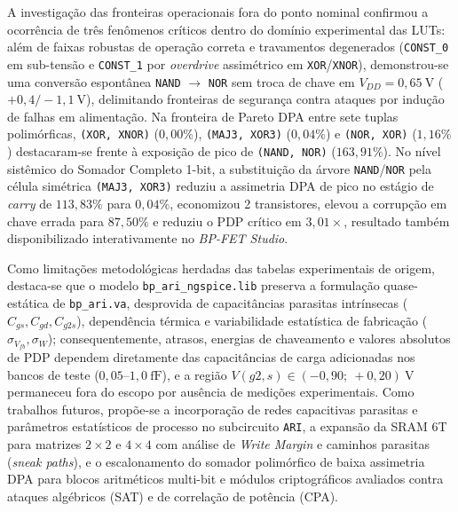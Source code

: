 A investiga\c{c}\~{a}o das fronteiras operacionais fora do ponto nominal confirmou a ocorr\^{e}ncia de tr\^{e}s fen\^{o}menos cr\'{i}ticos dentro do dom\'{i}nio experimental das LUTs: al\'{e}m de faixas robustas de opera\c{c}\~{a}o correta e travamentos degenerados (\texttt{CONST\_0} em sub-tens\~{a}o e \texttt{CONST\_1} por \textit{overdrive} assim\'{e}trico em \texttt{XOR}/\texttt{XNOR}), demonstrou-se uma convers\~{a}o espont\^{a}nea \texttt{NAND} $\to$ \texttt{NOR} sem troca de chave em $V_{DD}=0{,}65\ \text{V}$ ($+0{,}4/-1{,}1\ \text{V}$), delimitando fronteiras de seguran\c{c}a contra ataques por indu\c{c}\~{a}o de falhas em alimenta\c{c}\~{a}o. Na fronteira de Pareto DPA entre sete tuplas polim\'{o}rficas, \texttt{(XOR, XNOR)} ($0{,}00\%$), \texttt{(MAJ3, XOR3)} ($0{,}04\%$) e \texttt{(NOR, XOR)} ($1{,}16\%$) destacaram-se frente \`{a} exposi\c{c}\~{a}o de pico de \texttt{(NAND, NOR)} ($163{,}91\%$). No n\'{i}vel sist\^{e}mico do Somador Completo 1-bit, a substitui\c{c}\~{a}o da \'{a}rvore \texttt{NAND}/\texttt{NOR} pela c\'{e}lula sim\'{e}trica \texttt{(MAJ3, XOR3)} reduziu a assimetria DPA de pico no est\'{a}gio de \textit{carry} de $113{,}83\%$ para $0{,}04\%$, economizou 2 transistores, elevou a corrup\c{c}\~{a}o em chave errada para $87{,}50\%$ e reduziu o PDP cr\'{i}tico em $3{,}01\times$, resultado tamb\'{e}m disponibilizado interativamente no \textit{BP-FET Studio}.

Como limita\c{c}\~{o}es metodol\'{o}gicas herdadas das tabelas experimentais de origem, destaca-se que o modelo \texttt{bp\_ari\_ngspice.lib} preserva a formula\c{c}\~{a}o quase-est\'{a}tica de \texttt{bp\_ari.va}, desprovida de capacit\^{a}ncias parasitas intr\'{i}nsecas ($C_{gs}, C_{gd}, C_{g2s}$), depend\^{e}ncia t\'{e}rmica e variabilidade estat\'{i}stica de fabrica\c{c}\~{a}o ($\sigma_{V_{fb}}, \sigma_W$); consequentemente, atrasos, energias de chaveamento e valores absolutos de PDP dependem diretamente das capacit\^{a}ncias de carga adicionadas nos bancos de teste ($0{,}05\text{--}1{,}0\ \text{fF}$), e a regi\~{a}o $V(g2,s) \in (-0{,}90;\ +0{,}20)\ \text{V}$ permaneceu fora do escopo por aus\^{e}ncia de medi\c{c}\~{o}es experimentais. Como trabalhos futuros, prop\~{o}e-se a incorpora\c{c}\~{a}o de redes capacitivas parasitas e par\^{a}metros estat\'{i}sticos de processo no subcircuito \texttt{ARI}, a expans\~{a}o da SRAM 6T para matrizes $2 \times 2$ e $4 \times 4$ com an\'{a}lise de \textit{Write Margin} e caminhos parasitas (\textit{sneak paths}), e o escalonamento do somador polim\'{o}rfico de baixa assimetria DPA para blocos aritm\'{e}ticos multi-bit e m\'{o}dulos criptogr\'{a}ficos avaliados contra ataques alg\'{e}bricos (SAT) e de correla\c{c}\~{a}o de pot\^{e}ncia (CPA).
